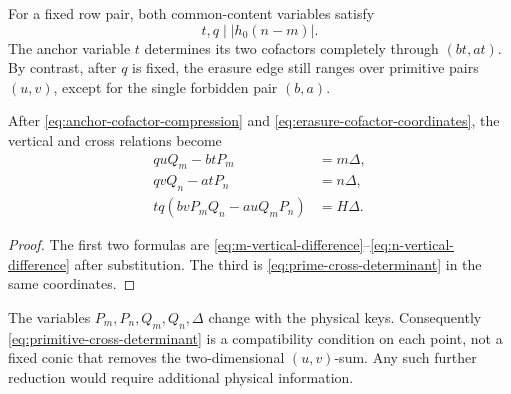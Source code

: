 \begin{corollary}
\label{cor:two-divisors-one-plane}
For a fixed row pair, both common-content variables satisfy
\[
 t,q\mid |h_0(n-m)|.
\]
The anchor variable \(t\) determines its two cofactors completely through
\((bt,at)\).  By contrast, after \(q\) is fixed, the erasure edge still
ranges over primitive pairs \((u,v)\), except for the single forbidden
pair \((b,a)\).
\end{corollary}

\begin{proposition}
\label{prop:primitive-four-corner-equations}
After \eqref{eq:anchor-cofactor-compression} and
\eqref{eq:erasure-cofactor-coordinates}, the vertical and cross relations
become
\begin{align}
 q uQ_m-btP_m&=m\Delta,
 \label{eq:primitive-m-vertical}\\
 q vQ_n-atP_n&=n\Delta,
 \label{eq:primitive-n-vertical}\\
 tq(bvP_mQ_n-auQ_mP_n)&=H\Delta.
 \label{eq:primitive-cross-determinant}
\end{align}
\end{proposition}

\begin{proof}
The first two formulas are
\eqref{eq:m-vertical-difference}--\eqref{eq:n-vertical-difference}
after substitution.  The third is \eqref{eq:prime-cross-determinant} in
the same coordinates.
\end{proof}

\begin{remark}
\label{rem:cross-does-not-collapse-plane}
The variables \(P_m,P_n,Q_m,Q_n,\Delta\) change with the physical keys.
Consequently \eqref{eq:primitive-cross-determinant} is a compatibility
condition on each point, not a fixed conic that removes the
two-dimensional \((u,v)\)-sum.  Any such further reduction would require
additional physical information.
\end{remark}
